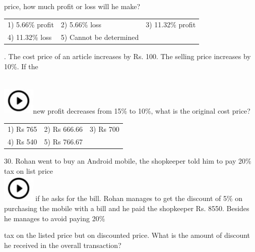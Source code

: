 \documentclass{article}
\begin{document}
	\noindent price, how much profit or loss will he make?
	
	\noindent 
	

		 
	\begin{tabular}{p{1.7in} p{1.6in} p{1.6in}} \\ 
 1) 5.66\% profit  & 2) 5.66\% loss  & 3) 11.32\% profit 
		\\
4) 11.32\% loss  & 5) Cannot be determined  \\
\end{tabular}
	
	
	
	
	\noindent 
	
	. The cost price of an article increases by Rs. 100. The selling price increases by 10\%. If the
	
	\noindent \noindent \\ \includegraphics*[width=0.60in, height=0.52in]{images/image1}new profit decreases from 15\% to 10\%, what is the original cost price?
	
	\noindent  
	\begin{tabular}{p{1.7in} p{1.6in} p{1.6in}} \\ 
 1) Rs 765                & 2) Rs 666.66     & 3) Rs 700          \\
4) Rs 540          & 5) Rs 766.67 \\
\end{tabular}
	
	\noindent 
	
	\noindent 
	
	\noindent 
	
	30. Rohan went to buy an Android mobile, the shopkeeper told him to pay 20\% tax on list price \noindent \\ \includegraphics*[width=0.60in, height=0.52in]{images/image1} if he asks for the bill. Rohan manages to get the discount of 5\% on purchasing the mobile with a bill and he paid the shopkeeper Rs. 8550. Besides he manages to avoid paying 20\%
	
	\noindent 
	
	\noindent tax on the listed price but on discounted price. What is the amount of discount he received in the overall transaction?
	
\end{document}
